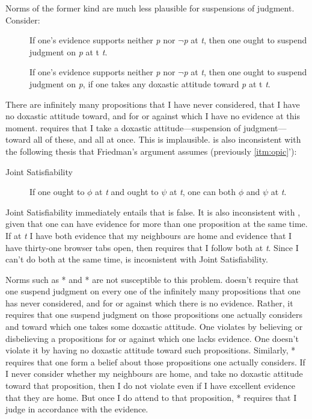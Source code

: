 \documentclass[12pt]{article}
\begin{document}
Norms of the former kind are much less plausible for suspensions of judgment. Consider:

\begin{description}
    \item[\so] If one's evidence supports neither \textit{p} nor $\neg $\textit{p} at \textit{t}, then one ought to suspend judgment on \textit{p} at t \textit{t}.
    \item[\so*] If one's evidence supports neither \textit{p} nor $\neg $\textit{p} at \textit{t}, then one ought to suspend judgment on \textit{p}, if one takes any doxastic attitude toward \textit{p} at t \textit{t}.
\end{description}
%
There are infinitely many propositions that I have never considered, that I have no doxastic attitude toward, and for or against which I have no evidence at this moment. \so{} requires that I take a doxastic attitude---suspension of judgment---toward all of these, and all at once. This is implausible. \so{} is also inconsistent with the following thesis that Friedman's argument assumes (previously \ref{itm:opic}'):

%
\newcommand{\js}{Joint Satisfiability}
\begin{description}
    \item[\js{}] If one ought to $\phi$ at \textit{t} and ought to $\psi$ at \textit{t}, one can both $\phi$ and $\psi$ at \textit{t}.
\end{description}
%
\js{} immediately entails that \so{} is false. It is also inconsistent with \eo{}, given that one can have evidence for more than one proposition at the same time. If at \textit{t} I have both evidence that my neighbours are home and evidence that I have thirty-one browser tabs open, then \eo{} requires that I follow both at \textit{t}. Since I can't do both at the same time, \eo{} is incosnistent with \js{}.

Norms such as \eo{}* and \so{}* are not susceptible to this problem. \so*{} doesn't require that one suspend judgment on every one of the infinitely many propositions that one has never considered, and for or against which there is no evidence. Rather, it requires that one suspend judgment on those propositions one actually considers and toward which one takes some doxastic attitude. One violates \so*{} by believing or disbelieving a propositions for or against which one lacks evidence. One doesn't violate it by having no doxastic attitude toward such propositions. Similarly, \eo{}* requires that one form a belief about those propositions one actually considers. If I never consider whether my neighbours are home, and take no doxastic attitude toward that proposition, then I do not violate \eo*{} even if I have excellent evidence that they are home. But once I do attend to that proposition, \eo{}* requires that I judge in accordance with the evidence.
\end{document}
